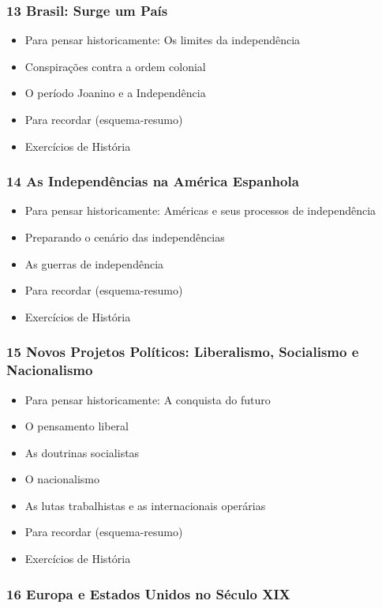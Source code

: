\documentclass[a4paper,12pt]{article}[abntex2]
\begin{document}
\subsubsection*{13 Brasil: Surge um País}

\begin{itemize}
\item Para pensar historicamente: Os limites da independência
\item Conspirações contra a ordem colonial
\item O período Joanino e a Independência
\item Para recordar (esquema-resumo)
\item Exercícios de História
\end{itemize}
\subsubsection*{14 As Independências na América Espanhola}

\begin{itemize}
\item Para pensar historicamente: Américas e seus processos de independência
\item Preparando o cenário das independências
\item As guerras de independência
\item Para recordar (esquema-resumo)
\item Exercícios de História
\end{itemize}
\subsubsection*{15 Novos Projetos Políticos: Liberalismo, Socialismo e Nacionalismo}

\begin{itemize}
\item Para pensar historicamente: A conquista do futuro
\item O pensamento liberal
\item As doutrinas socialistas
\item O nacionalismo
\item As lutas trabalhistas e as internacionais operárias
\item Para recordar (esquema-resumo)
\item Exercícios de História
\end{itemize}
\subsubsection*{16 Europa e Estados Unidos no Século XIX}
\end{document}

